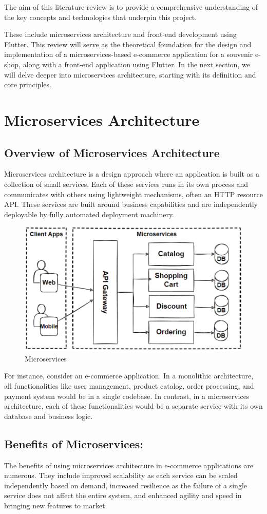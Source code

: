 The aim of this literature review is to provide a comprehensive understanding of the key concepts and technologies that underpin this project.

These include microservices architecture and front-end development using Flutter. This review will serve as the theoretical foundation for the design and implementation of a microservices-based e-commerce application for a souvenir e-shop, along with a front-end application using Flutter.
In the next section, we will delve deeper into microservices architecture, starting with its definition and core principles.
\section{Microservices Architecture}
\subsection{Overview of Microservices Architecture}
Microservices architecture is a design approach where an application is built as a collection of small services. Each of these services runs in its own process and communicates with others using lightweight mechanisms, often an HTTP resource API. These services are built around business capabilities and are independently deployable by fully automated deployment machinery.
\begin{figure}[H]
    \centering
    \includegraphics[width=.64\linewidth]{../images/micoservices_visualization.png}
    \caption{Microservices}\label{Fig:NN}
\end{figure}

For instance, consider an e-commerce application. In a monolithic architecture, all functionalities like user management, product catalog, order processing, and payment system would be in a single codebase. In contrast, in a microservices architecture, each of these functionalities would be a separate service with its own database and business logic.

\subsection{Benefits of Microservices:}
The benefits of using microservices architecture in e-commerce applications are numerous. They include improved scalability as each service can be scaled independently based on demand, increased resilience as the failure of a single service does not affect the entire system, and enhanced agility and speed in bringing new features to market.

